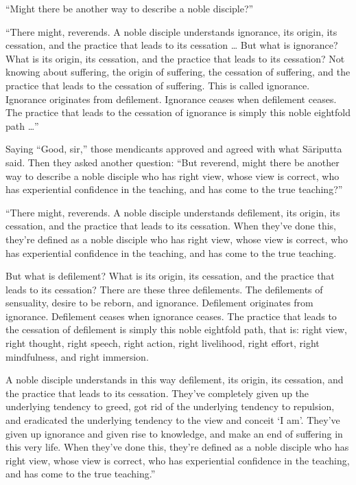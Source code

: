 \documentclass[12pt,openany]{book}%
\begin{document}
“Might there be another way to describe a noble disciple?” 

“There might, reverends. A noble disciple understands ignorance, its origin, its cessation, and the practice that leads to its cessation … But what is ignorance? What is its origin, its cessation, and the practice that leads to its cessation? Not knowing about suffering, the origin of suffering, the cessation of suffering, and the practice that leads to the cessation of suffering. This is called ignorance. Ignorance originates from defilement. Ignorance ceases when defilement ceases. The practice that leads to the cessation of ignorance is simply this noble eightfold path …” 

Saying “Good, sir,” those mendicants approved and agreed with what \textsanskrit{Sāriputta} said. Then they asked another question: “But reverend, might there be another way to describe a noble disciple who has right view, whose view is correct, who has experiential confidence in the teaching, and has come to the true teaching?” 

“There might, reverends. A noble disciple understands defilement, its origin, its cessation, and the practice that leads to its cessation. When they’ve done this, they’re defined as a noble disciple who has right view, whose view is correct, who has experiential confidence in the teaching, and has come to the true teaching. 

But what is defilement? What is its origin, its cessation, and the practice that leads to its cessation? There are these three defilements. The defilements of sensuality, desire to be reborn, and ignorance. Defilement originates from ignorance. Defilement ceases when ignorance ceases. The practice that leads to the cessation of defilement is simply this noble eightfold path, that is: right view, right thought, right speech, right action, right livelihood, right effort, right mindfulness, and right immersion. 

A noble disciple understands in this way defilement, its origin, its cessation, and the practice that leads to its cessation. They’ve completely given up the underlying tendency to greed, got rid of the underlying tendency to repulsion, and eradicated the underlying tendency to the view and conceit ‘I am’. They’ve given up ignorance and given rise to knowledge, and make an end of suffering in this very life. When they’ve done this, they’re defined as a noble disciple who has right view, whose view is correct, who has experiential confidence in the teaching, and has come to the true teaching.” 
\end{document}
